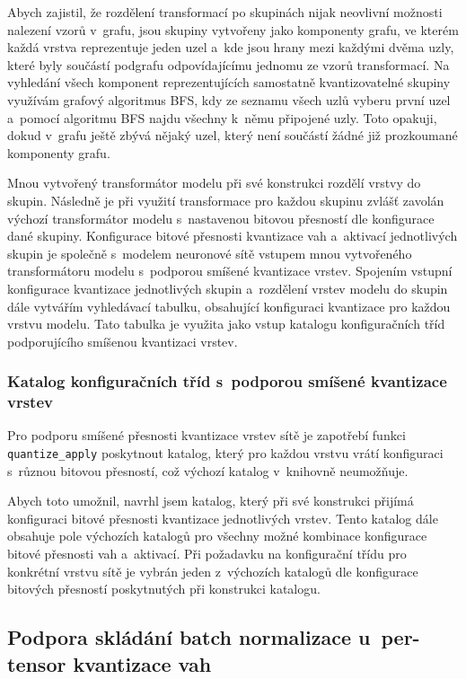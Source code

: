 Abych zajistil, že rozdělení transformací po skupinách nijak neovlivní možnosti nalezení vzorů v~grafu, jsou skupiny vytvořeny jako komponenty grafu, ve kterém každá vrstva reprezentuje jeden uzel a~kde jsou hrany mezi každými dvěma uzly, které byly součástí podgrafu odpovídajícímu jednomu ze vzorů transformací. Na vyhledání všech komponent reprezentujících samostatně kvantizovatelné skupiny využívám grafový algoritmus BFS, kdy ze seznamu všech uzlů vyberu první uzel a~pomocí algoritmu BFS najdu všechny k~němu připojené uzly. Toto opakuji, dokud v~grafu ještě zbývá nějaký uzel, který není součástí žádné již prozkoumané komponenty grafu.

Mnou vytvořený transformátor modelu při své konstrukci rozdělí vrstvy do skupin. Následně je při využití transformace pro každou skupinu zvlášť zavolán výchozí transformátor modelu s~nastavenou bitovou přesností dle konfigurace dané skupiny. Konfigurace bitové přesnosti kvantizace vah a~aktivací jednotlivých skupin je společně s~modelem neuronové sítě vstupem mnou vytvořeného transformátoru modelu s~podporou smíšené kvantizace vrstev. Spojením vstupní konfigurace kvantizace jednotlivých skupin a~rozdělení vrstev modelu do skupin dále vytvářím vyhledávací tabulku, obsahující konfiguraci kvantizace pro každou vrstvu modelu. Tato tabulka je využita jako vstup katalogu konfiguračních tříd podporujícího smíšenou kvantizaci vrstev.

\subsubsection{Katalog konfiguračních tříd s~podporou smíšené kvantizace vrstev}

Pro podporu smíšené přesnosti kvantizace vrstev sítě je zapotřebí funkci \verb|quantize_apply| poskytnout katalog, který pro každou vrstvu vrátí konfiguraci s~různou bitovou přesností, což výchozí katalog v~knihovně neumožňuje. 

Abych toto umožnil, navrhl jsem katalog, který při své konstrukci přijímá konfiguraci bitové přesnosti kvantizace jednotlivých vrstev. Tento katalog dále obsahuje pole výchozích katalogů pro všechny možné kombinace konfigurace bitové přesnosti vah a~aktivací. Při požadavku na konfigurační třídu pro konkrétní vrstvu sítě je vybrán jeden z~výchozích katalogů dle konfigurace bitových přesností poskytnutých při konstrukci katalogu.

\subsection{Podpora skládání batch normalizace u~per-tensor kvantizace vah}
\label{section:tf-bn-fold-impl}

